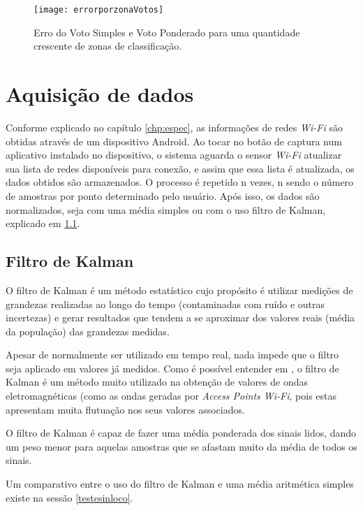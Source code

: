 \begin{figure}[!ht]
	\centering
	\caption{Erro do Voto Simples e Voto Ponderado para uma quantidade crescente de zonas de classificação.}
  \texttt{[image: errorporzonaVotos]}
\label{fig:zonaVotos}

\end{figure}


\section{Aquisição de dados}

Conforme explicado no capítulo \ref{chp:espec}, as informações de redes \textit{Wi-Fi} são obtidas através de um dispositivo Android. Ao tocar no botão de captura num aplicativo instalado no dispositivo, o sistema aguarda o sensor \textit{Wi-Fi} atualizar sua lista de redes disponíveis para conexão, e assim que essa lista é atualizada, os dados obtidos são armazenados. O processo é repetido n vezes, n sendo o número de amostras por ponto determinado pelo usuário. Após isso, os dados são normalizados, seja com uma média simples ou com o uso filtro de Kalman, explicado em \ref{kalman}.

\subsection{Filtro de Kalman}
\label{kalman}
O filtro de Kalman é um método estatístico cujo propósito é utilizar medições de grandezas realizadas ao longo do tempo (contaminadas com ruído e outras incertezas) e gerar resultados que tendem a se aproximar dos valores reais (média da população) das grandezas medidas.
\par
Apesar de normalmente ser utilizado em tempo real, nada impede que o filtro seja aplicado em valores já medidos. Como é possível entender em \cite{7471364}, o filtro de Kalman é um método muito utilizado na obtenção de valores de ondas eletromagnéticas (como as ondas geradas por \textit{Access Points Wi-Fi}, pois estas apresentam muita flutuação nos seus valores associados.
\par
O filtro de Kalman é capaz de fazer uma média ponderada dos sinais lidos, dando um peso menor para aquelas amostras que se afastam muito da média de todos os sinais.
\par Um comparativo entre o uso do filtro de Kalman e uma média aritmética simples existe na sessão \ref{testesinloco}.

